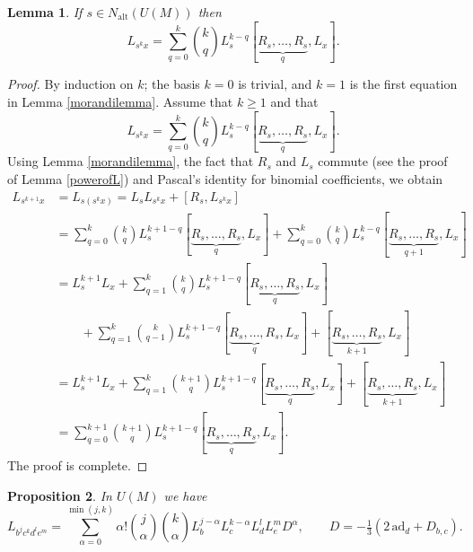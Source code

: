 \documentclass{amsart}
\theoremstyle{plain}
\newtheorem{lemma}{Lemma}[section]
\newtheorem{proposition}[lemma]{Proposition}
\theoremstyle{definition}
\begin{document}
\begin{lemma} \label{bigmorandilemma}
If $s\in N_{\mathrm{alt}} (U(M))$ then
  \[
  L_{ s^k x }
  =
  \sum^k_{q=0}
  \binom{k}{q}
  L^{k-q}_s
  [ \underbrace{R_s,\dots,R_s}_q, L_x ].
  \]
\end{lemma}

\begin{proof}
By induction on $k$; the basis $k = 0$ is trivial, and $k = 1$ is the first
equation in Lemma \ref{morandilemma}. Assume that $k \ge 1$ and that
  \[
  L_{s^k x}
  =
  \sum_{q=0}^k
  \binom{k}{q}
  L^{k-q}_s
  [ \underbrace{R_s,\dots,R_s}_q, L_x ].
  \]
Using Lemma \ref{morandilemma}, the fact that $R_s$ and $L_s$ commute (see the
proof of Lemma \ref{powerofL}) and Pascal's identity for binomial coefficients,
we obtain
  \allowdisplaybreaks
  \begin{align*}
  L_{s^{k+1}x}
  &=
  L_{s(s^k x)}
  =
  L_s L_{s^kx} + [R_s, L_{s^k x}]
  \\
  &=
  \sum_{q=0}^k
  \binom{k}{q}
  L^{k+1-q}_s
  [ \underbrace{R_s,\dots,R_s}_q, L_x ]
  +
  \sum_{q=0}^k \binom{k}{q}
  L^{k-q}_s
  [ \underbrace{R_s,\dots,R_s}_{q+1}, L_x ]
  \\
  &=
  L^{k+1}_s L_x
  +
  \sum_{q=1}^k
  \binom{k}{q}
  L^{k+1-q}_s
  [ \underbrace{R_s,\dots,R_s}_q, L_x ]
  \\
  &\qquad
  +
  \sum_{q=1}^k
  \binom{k}{q{-}1}
  L^{k+1-q}_s
  [ \underbrace{R_s,\dots, R_s}_q, L_x ]
  +
  [ \underbrace{R_s,\dots, R_s}_{k+1}, L_x ]
  \\
  &=
  L^{k+1}_s L_x
  +
  \sum_{q=1}^k
  \binom{k{+}1}{q}
  L^{k+1-q}_s
  [ \underbrace{R_s,\dots, R_s}_q, L_x ]
  +
  [ \underbrace{R_s,\dots,R_s}_{k+1}, L_x ]
  \\
  &=
  \sum_{q=0}^{k+1}
  \binom{k{+}1}{q}
  L^{k+1-q}_s
  [ \underbrace{R_s,\dots,R_s}_q, L_x ].
  \end{align*}
The proof is complete.
\end{proof}

\begin{proposition}\label{bcde-operator}
In $U(M)$ we have
  \[
  L_{ b^j c^k d^l e^m }
  =
  \sum_{\alpha=0}^{\min(j,k)}
  \alpha!
  \binom{j}{\alpha}
  \binom{k}{\alpha}
  L^{j-\alpha}_b
  L^{k-\alpha}_c
  L^l_d
  L^m_e
  D^{\alpha},
  \qquad
  D = -\tfrac13 ( 2 \, \mathrm{ad}_d + D_{b,c} ).
  \]
\end{proposition}
\end{document}
